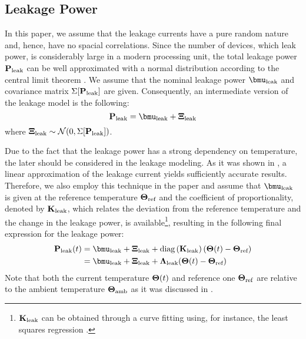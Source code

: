 \subsection{Leakage Power}
In this paper, we assume that the leakage currents have a pure random nature and, hence, have no spacial correlations. Since the number of devices, which leak power, is considerably large in a modern processing unit, the total leakage power $\mathbf{P}_{\text{leak}}$ can be well approximated with a normal distribution according to the central limit theorem \cite{durrett2010}. We assume that the nominal leakage power $\vmean{\leak}$ and covariance matrix $\Sigma[\mathbf{P}_{\text{leak}}]$ are given. Consequently, an intermediate version of the leakage model is the following:
\[
  \vpower_\leak = \vmean{\leak} + \vnormal_\leak
\]
where $\mathbf{\Xi}_{\text{leak}} \sim \mathcal{N}(0, \Sigma[\mathbf{P}_{\text{leak}}])$.

Due to the fact that the leakage power has a strong dependency on temperature, the later should be considered in the leakage modeling. As it was shown in \cite{liu2007}, a linear approximation of the leakage current yields sufficiently accurate results. Therefore, we also employ this technique in the paper and assume that $\vmean{\leak}$ is given at the reference temperature $\mathbf{\Theta}_{\text{ref}}$ and the coefficient of proportionality, denoted by $\mathbf{K}_{\text{leak}}$, which relates the deviation from the reference temperature and the change in the leakage power, is available\footnote{$\mathbf{K}_{\text{leak}}$ can be obtained through a curve fitting using, for instance, the least squares regression \cite{press2007}.}, resulting in the following final expression for the leakage power:
\begin{align} \equlabel{leakage-power}
  \vpower_\leak(\time) & = \vmean{\leak} + \vnormal_\leak + \diag{\vratio_\leak}(\vtemperature(\time) - \vtemperature_\refer) \\
  & = \vmean{\leak} + \vnormal_\leak + \ddeviation{\leak}(\vtemperature(\time) - \vtemperature_\refer) \nonumber
\end{align}
Note that both the current temperature $\mathbf{\Theta}(t)$ and reference one $\mathbf{\Theta}_{\text{ref}}$ are relative to the ambient temperature $\mathbf{\Theta}_{\text{amb}}$ as it was discussed in .


